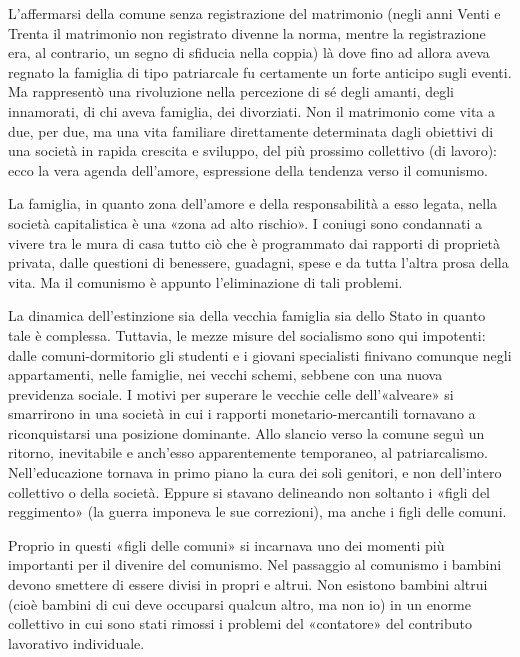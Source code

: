 \documentclass[../main]{subfiles}
\begin{document}
L'affermarsi della comune senza registrazione del matrimonio (negli anni Venti e Trenta il matrimonio non registrato divenne la norma, mentre la registrazione era, al contrario, un segno di sfiducia nella coppia) là dove fino ad allora aveva regnato la famiglia di tipo patriarcale fu certamente un forte anticipo sugli eventi. Ma rappresentò una rivoluzione nella percezione di sé degli amanti, degli innamorati, di chi aveva famiglia, dei divorziati. Non il matrimonio come vita a due, per due, ma una vita familiare direttamente determinata dagli obiettivi di una società in rapida crescita e sviluppo, del più prossimo collettivo (di lavoro): ecco la vera agenda dell'amore, espressione della tendenza verso il comunismo.

La famiglia, in quanto zona dell'amore e della responsabilità a esso legata, nella società capitalistica è una «zona ad alto rischio». I coniugi sono condannati a vivere tra le mura di casa tutto ciò che è programmato dai rapporti di proprietà privata, dalle questioni di benessere, guadagni, spese e da tutta l'altra prosa della vita. Ma il comunismo è appunto l'eliminazione di tali problemi.

La dinamica dell'estinzione sia della vecchia famiglia sia dello Stato in quanto tale è complessa. Tuttavia, le mezze misure del socialismo sono qui impotenti: dalle comuni-dormitorio gli studenti e i giovani specialisti finivano comunque negli appartamenti, nelle famiglie, nei vecchi schemi, sebbene con una nuova previdenza sociale. I motivi per superare le vecchie celle dell'«alveare» si smarrirono in una società in cui i rapporti monetario-mercantili tornavano a riconquistarsi una posizione dominante. Allo slancio verso la comune seguì un ritorno, inevitabile e anch'esso apparentemente temporaneo, al patriarcalismo. Nell'educazione tornava in primo piano la cura dei soli genitori, e non dell'intero collettivo o della società. Eppure si stavano delineando non soltanto i «figli del reggimento» (la guerra imponeva le sue correzioni), ma anche i figli delle comuni.

Proprio in questi «figli delle comuni» si incarnava uno dei momenti più importanti per il divenire del comunismo. Nel passaggio al comunismo i bambini devono smettere di essere divisi in propri e altrui. Non esistono bambini altrui (cioè bambini di cui deve occuparsi qualcun altro, ma non io) in un enorme collettivo in cui sono stati rimossi i problemi del «contatore» del contributo lavorativo individuale.
\end{document}
